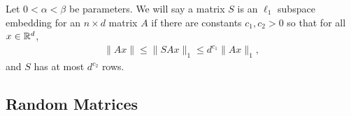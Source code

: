 \begin{definition}\label{def:l1_subspace_embedding}%
Let $0< \alpha < \beta$ be parameters. We will say a matrix $S$ is an $\ell_1$ subspace embedding for an $n \times d$ matrix $A$ if there are constants $c_1, c_2 > 0$ so that for all $x \in \mathbb{R}^{d}$,
\begin{align*}
    \|Ax\|\leq \|SAx\|_1 \leq d^{c_1} \|Ax\|_1,
\end{align*}
and $S$ has at most $d^{c_2}$ rows.
\end{definition}

\subsection{Random Matrices}\label{sec:rand_mat}


